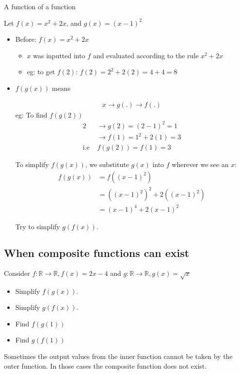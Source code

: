 \documentclass[12pt]{article}
\begin{document}
A function of a function


Let $f(x)  = x^{2} + 2x$, and $g(x) = (x-1)^{2}$
\begin{itemize}
    \item Before: $f(x)  = x^{2} + 2x$
    \begin{itemize}
        \item $x$ was inputted into $f$ and evaluated according to the rule $x^{2} + 2x$
        \item eg: to get $f(2)$: $f(2) = 2^{2} + 2(2) = 4 + 4 = 8 $
    \end{itemize}
    \item $f(g(x))$ means
    
\begin{align*}
x \longrightarrow g(.) \longrightarrow f(.)
\end{align*}
eg: To find $f(g(2))$
\begin{align*}
2 & \longrightarrow g(2) = (2-1)^{2} = 1 \\
  & \longrightarrow f(1) = 1^{2} + 2(1) = 3\\
\text{i.e } & f(g(2)) = f(1) = 3
\end{align*}

To simplify $f(g(x))$, we substitute $g(x)$ into $f$ wherever we see an $x$:
\begin{align*} 
f(g(x)) & = f((x-1)^{2}) \\
         & = ((x-1)^{2})^{2} + 2((x-1)^{2}) \\
         & = (x-1)^{4} + 2(x-1)^{2}
\end{align*}

Try to simplify $g(f(x))$.
\end{itemize}
\newpage

\subsection{When composite functions can exist}

Consider $f: \mathbb{R} \to \mathbb{R}, f(x) = 2x-4$ and $g: \mathbb{R} \to \mathbb{R}, g(x) = \sqrt{x}$
\begin{itemize}
    \item Simplify $f(g(x))$.
    \item Simplify $g(f(x))$.
    \item Find $f(g(1))$
    \item Find $g(f(1))$
\end{itemize}

Sometimes the output values from the inner function cannot be taken by the outer function. In those cases the composite function does not exist.
\end{document}
